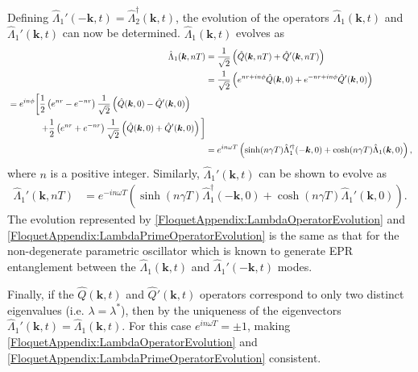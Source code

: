 Defining $\hat{\Lambda}_1'(-\bm{k}, t) = \hat{\Lambda}_2^\dagger(\bm{k}, t)$, the evolution of the operators $\hat{\Lambda}_1(\bm{k}, t)$ and $\hat{\Lambda}_1'(\bm{k}, t)$ can now be determined. $\hat{\Lambda}_1(\bm{k}, t)$ evolves as
\begin{align}
    \hat{\Lambda}_1(\bm{k}, nT) &= \frac{1}{\sqrt{2}} \left(\hat{Q}(\bm{k}, nT) + \hat{Q}'(\bm{k}, nT) \right) \\
        &= \frac{1}{\sqrt{2}} \left( e^{nr + i n\phi} \hat{Q}(\bm{k}, 0) + e^{-nr + i n \phi}\hat{Q}'(\bm{k}, 0)\right) \\
        \begin{split}
            &=  e^{i n \phi} \bigg[ \frac{1}{2}\left( e^{nr} - e^{-nr}\right)\frac{1}{\sqrt{2}}\left(\hat{Q}(\bm{k}, 0) - \hat{Q}'(\bm{k}, 0) \right) \\
            &\relphantom{=e^{i n \phi}\bigg[} + \frac{1}{2} \left( e^{nr} + e^{-nr}\right)\frac{1}{\sqrt{2}} \left( \hat{Q}(\bm{k}, 0) + \hat{Q}'(\bm{k}, 0)\right)\bigg]
        \end{split}\\
        &= e^{i n \omega T} \left( \sinh(n\gamma T) \hat{\Lambda}_1'^\dagger(-\bm{k}, 0) + \cosh(n \gamma T) \hat{\Lambda}_1(\bm{k}, 0)\right), \label{FloquetAppendix:LambdaOperatorEvolution}
\end{align}
where $n$ is a positive integer. Similarly, $\hat{\Lambda}_1'(\bm{k}, t)$ can be shown to evolve as
\begin{align}
    \hat{\Lambda}_1'(\bm{k}, nT) &= e^{-i n \omega T} \left( \sinh(n \gamma T) \hat{\Lambda}_1^\dagger(-\bm{k}, 0) + \cosh(n \gamma T) \hat{\Lambda}_1'(\bm{k}, 0)\right). \label{FloquetAppendix:LambdaPrimeOperatorEvolution}
\end{align}
The evolution represented by \eqref{FloquetAppendix:LambdaOperatorEvolution} and \eqref{FloquetAppendix:LambdaPrimeOperatorEvolution} is the same as that for the non-degenerate parametric oscillator \citep{WallsMilburn} which is known to generate EPR entanglement between the $\hat{\Lambda}_1(\bm{k}, t)$ and $\hat{\Lambda}_1'(-\bm{k}, t)$ modes.

Finally, if the $\hat{Q}(\bm{k}, t)$ and $\hat{Q}'(\bm{k}, t)$ operators correspond to only two distinct eigenvalues (i.e. $\lambda = \lambda^*$), then by the uniqueness of the eigenvectors $\hat{\Lambda}_1'(\bm{k}, t) = \hat{\Lambda}_1(\bm{k}, t)$. For this case $\displaystyle e^{i n\omega T} = \pm 1$, making \eqref{FloquetAppendix:LambdaOperatorEvolution} and \eqref{FloquetAppendix:LambdaPrimeOperatorEvolution} consistent.

